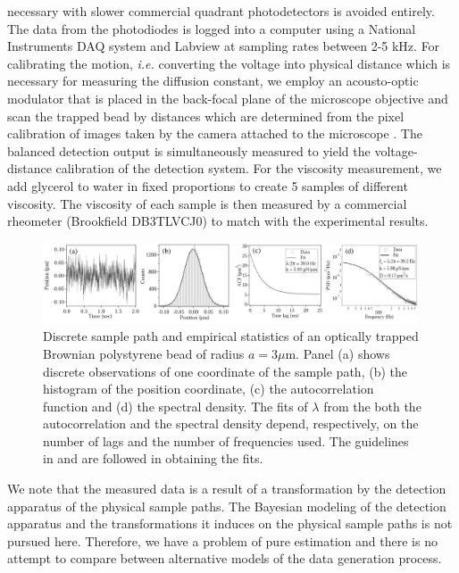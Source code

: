 \documentclass[english,aps, onecolumn, prl,superscriptaddress, notitlepage]{revtex4-1}
\begin{document}
necessary with slower commercial quadrant photodetectors is avoided
entirely. The data from the photodiodes is logged into a computer
using a National Instruments DAQ system and Labview at sampling rates
between 2-5 kHz. For calibrating the motion, \emph{i.e.} converting
the voltage into physical distance which is necessary for measuring
the diffusion constant, we employ an acousto-optic modulator that
is placed in the back-focal plane of the microscope objective and
scan the trapped bead by distances which are determined from the pixel
calibration of images taken by the camera attached to the microscope
\cite{rsi12}. The balanced detection output is simultaneously measured
to yield the voltage-distance calibration of the detection system.
For the viscosity measurement, we add glycerol to water in fixed proportions
to create 5 samples of different viscosity. The viscosity of each
sample is then measured by a commercial rheometer (Brookfield DB3TLVCJ0)
to match with the experimental results.
\begin{figure}[t!]
\centering
\includegraphics[width=0.99\textwidth]{figure2.jpg}
\caption{Discrete sample path and empirical statistics of an optically trapped
Brownian polystyrene bead of radius $a=3\mu$m. Panel (a) shows discrete
observations of one coordinate of the sample path, (b) the histogram
of the position coordinate, (c) the autocorrelation function and (d)
the spectral density. The fits of $\lambda$ from the both the autocorrelation
and the spectral density depend, respectively, on the number of lags
and the number of frequencies used. The guidelines in \cite{berg2004power}
and \cite{tassieri2012microrheology} are followed in obtaining the
fits. \label{fig:discrete-sample-path}}
\end{figure}

We note that the measured data is a result of a transformation by
the detection apparatus of the physical sample paths. The Bayesian
modeling of the detection apparatus and the transformations it induces
on the physical sample paths is not pursued here. Therefore, we have
a problem of pure estimation and there is no attempt to compare between
alternative models of the data generation process. 
\end{document}
